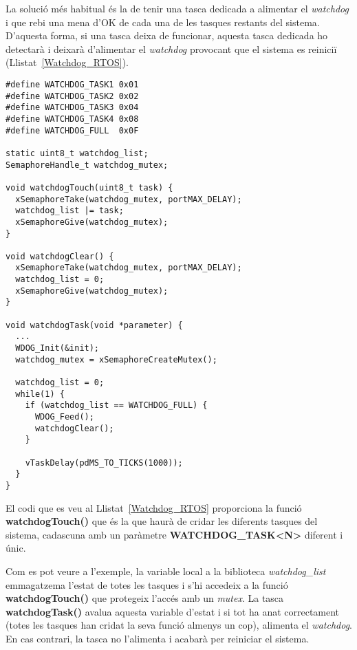 La solució més habitual és la de tenir una tasca dedicada a alimentar el {\em watchdog} i que rebi una mena d'OK de cada una de les tasques restants del sistema. D'aquesta forma, si una tasca deixa de funcionar, aquesta tasca dedicada ho detectarà i deixarà d'alimentar el {\em watchdog} provocant que el sistema es reiniciï (Llistat~\ref{Watchdog_RTOS}).

\begin{lstlisting}[style=customc,caption={Codi d'exemple de la tasca de control del {\bf watchdog}},label=Watchdog_RTOS]
#define WATCHDOG_TASK1 0x01
#define WATCHDOG_TASK2 0x02
#define WATCHDOG_TASK3 0x04
#define WATCHDOG_TASK4 0x08
#define WATCHDOG_FULL  0x0F

static uint8_t watchdog_list;
SemaphoreHandle_t watchdog_mutex;

void watchdogTouch(uint8_t task) {
  xSemaphoreTake(watchdog_mutex, portMAX_DELAY);
  watchdog_list |= task;
  xSemaphoreGive(watchdog_mutex);
}

void watchdogClear() {
  xSemaphoreTake(watchdog_mutex, portMAX_DELAY);
  watchdog_list = 0;
  xSemaphoreGive(watchdog_mutex);
}

void watchdogTask(void *parameter) {
  ...
  WDOG_Init(&init);
  watchdog_mutex = xSemaphoreCreateMutex();

  watchdog_list = 0;
  while(1) {
    if (watchdog_list == WATCHDOG_FULL) {
      WDOG_Feed();
      watchdogClear();      
    } 

    vTaskDelay(pdMS_TO_TICKS(1000));
  }
}
\end{lstlisting}

El codi que es veu al Llistat~\ref{Watchdog_RTOS} proporciona la funció {\bf watchdogTouch()} que és la que haurà de cridar les diferents tasques del sistema, cadascuna amb un paràmetre {\bf WATCHDOG\_TASK<N>} diferent i únic.

Com es pot veure a l'exemple, la variable local a la biblioteca {\em watchdog\_list} emmagatzema l'estat de totes les tasques i s'hi accedeix a la funció {\bf watchdogTouch()} que protegeix l'accés amb un {\em mutex}. La tasca {\bf watchdogTask()} avalua aquesta variable d'estat i si tot ha anat correctament (totes les tasques han cridat la seva funció almenys un cop), alimenta el {\em watchdog}. En cas contrari, la tasca no l'alimenta i acabarà per reiniciar el sistema.

